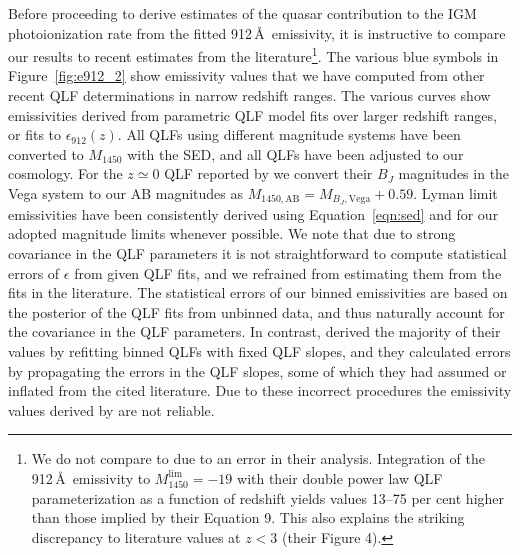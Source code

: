 \documentclass[fleqn,usenatbib]{mnras}
\begin{document}
Before proceeding to derive estimates of the quasar contribution to
the IGM  photoionization rate from the fitted
912\,\AA\ emissivity, it is instructive to compare our results to
recent estimates from the literature\footnote{We do not compare to
  \citet{2017MNRAS.466.1160M} due to an error in their analysis.
  Integration of the 912\,\AA\ emissivity to
  $M_{1450}^\mathrm{lim}=-19$ with their double power law QLF
  parameterization as a function of redshift yields values 13--75 per
  cent higher than those implied by their Equation 9.  This also
  explains the striking discrepancy to literature values at $z<3$
  (their Figure 4).}.  The various blue symbols in
Figure~\ref{fig:e912_2} show emissivity values that we have computed
from other recent QLF determinations in narrow redshift ranges.  The
various curves show emissivities derived from parametric QLF model
fits over larger redshift ranges, or fits to
$\epsilon_{912}\left(z\right)$. All QLFs using different magnitude
systems have been converted to $M_{1450}$ with the
\citet{2015MNRAS.449.4204L} SED, and all QLFs have been adjusted to
our cosmology.  For the $z\simeq 0$ QLF reported by
\citet{2009A&A...507..781S} we convert their $B_J$ magnitudes in the
Vega system to our AB magnitudes as $M_{1450,\mathrm{AB}}=M_{B_J,
  \mathrm{Vega}}+0.59$.  Lyman limit emissivities have been
consistently derived using Equation~\eqref{eqn:sed} and for our
adopted magnitude limits whenever possible.  We note that due to
strong covariance in the QLF parameters it is not straightforward to
compute statistical errors of $\epsilon$ from given QLF fits, and we
refrained from estimating them from the fits in the literature.  The
statistical errors of our binned emissivities are based on the
posterior of the QLF fits from unbinned data, and thus naturally
account for the covariance in the QLF parameters.  In contrast,
\citet{2015MNRAS.451L..30K} derived the majority of their values by
refitting binned QLFs with fixed QLF slopes, and they calculated
errors by propagating the errors in the QLF slopes, some of which they
had assumed or inflated from the cited literature.  Due to these
incorrect procedures the emissivity values derived by
\citet{2015MNRAS.451L..30K} are not reliable.
\end{document}
